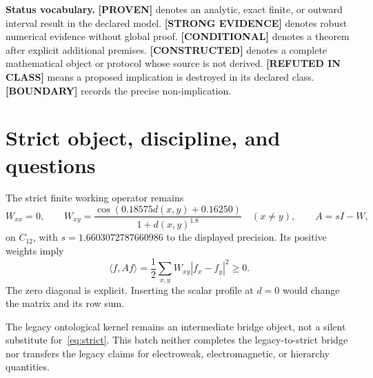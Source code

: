 \documentclass[11pt,a4paper]{article}
\newcommand{\proven}{\textcolor{green!40!black}{\textbf{[PROVEN]}}}
\newcommand{\strong}{\textcolor{blue!70!black}{\textbf{[STRONG EVIDENCE]}}}
\newcommand{\conditional}{\textcolor{black!60}{\textbf{[CONDITIONAL]}}}
\newcommand{\constructed}{\textcolor{violet!70!black}{\textbf{[CONSTRUCTED]}}}
\newcommand{\failed}{\textcolor{red!72!black}{\textbf{[REFUTED IN CLASS]}}}
\newcommand{\statusboundary}{\textcolor{orange!80!black}{\textbf{[BOUNDARY]}}}
\begin{document}
\begin{abstract}
ST65 finds that the localized anti-continuum branch loses regular numerical continuation near coupling $0.0165$ and finds no localized root at strict coupling in 240 starts; this remains evidence, not nonexistence. ST66 supplies and completely classifies a smooth coercive polynomial $C_{12}$-equivariant selection model with twelve stable branches, but all gain and anisotropy coefficients are inserted. ST67 constructs a gauge-invariant Bargmann chirality that changes sign under reflection while both orientations retain $\pi$ holonomy, proving that flux and chirality are independent data. ST68 exports a calibration and custody validator. ST69 retains all nine physical source groups. Thus the arithmetic frontier advances, while selector, gain, scale, carrier, and physical-source frontiers remain open.
\end{abstract}

\textbf{Status vocabulary.} \proven{} denotes an analytic, exact finite, or outward interval result in the declared model. \strong{} denotes robust numerical evidence without global proof. \conditional{} denotes a theorem after explicit additional premises. \constructed{} denotes a complete mathematical object or protocol whose source is not derived. \failed{} means a proposed implication is destroyed in its declared class. \statusboundary{} records the precise non-implication.

\tableofcontents
\newpage

\section{Strict object, discipline, and questions}

The strict finite working operator remains
\begin{equation}
W_{xx}=0,\qquad
W_{xy}=\frac{\cos(0.18575d(x,y)+0.16250)}{1+d(x,y)^{1.8}}\quad(x\ne y),
\qquad A=sI-W,
\label{eq:strict}
\end{equation}
on $C_{12}$, with $s=1.6603072787660986$ to the displayed precision. Its positive weights imply
\[
\langle f,Af\rangle=\frac12\sum_{x,y}W_{xy}|f_x-f_y|^2\ge0.
\]
The zero diagonal is explicit. Inserting the scalar profile at $d=0$ would change the matrix and its row sum.

The legacy ontological kernel remains an intermediate bridge object, not a silent substitute for~\eqref{eq:strict}. This batch neither completes the legacy-to-strict bridge nor transfers the legacy claims for electroweak, electromagnetic, or hierarchy quantities.
\end{document}

